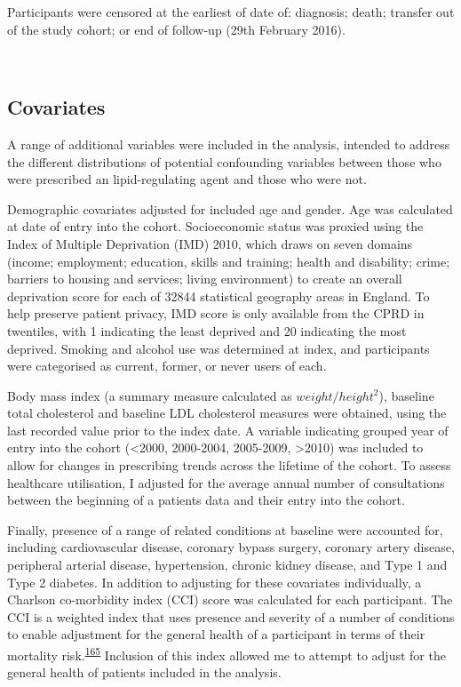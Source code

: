 \documentclass[a4paper, twoside]{templates/ociamthesis}
\begin{document}
Participants were censored at the earliest of date of: diagnosis; death; transfer out of the study cohort; or end of follow-up (29th February 2016).

~

\hypertarget{covariates}{%
\subsection{Covariates}\label{covariates}}

A range of additional variables were included in the analysis, intended to address the different distributions of potential confounding variables between those who were prescribed an lipid-regulating agent and those who were not.

Demographic covariates adjusted for included age and gender. Age was calculated at date of entry into the cohort. Socioeconomic status was proxied using the Index of Multiple Deprivation (IMD) 2010, which draws on seven domains (income; employment; education, skills and training; health and disability; crime; barriers to housing and services; living environment) to create an overall deprivation score for each of 32844 statistical geography areas in England. To help preserve patient privacy, IMD score is only available from the CPRD in twentiles, with 1 indicating the least deprived and 20 indicating the most deprived. Smoking and alcohol use was determined at index, and participants were categorised as current, former, or never users of each.

Body mass index (a summary measure calculated as \(weight/height^2\)), baseline total cholesterol and baseline LDL cholesterol measures were obtained, using the last recorded value prior to the index date. A variable indicating grouped year of entry into the cohort (\textless2000, 2000-2004, 2005-2009, \textgreater2010) was included to allow for changes in prescribing trends across the lifetime of the cohort. To assess healthcare utilisation, I adjusted for the average annual number of consultations between the beginning of a patients data and their entry into the cohort.

Finally, presence of a range of related conditions at baseline were accounted for, including cardiovascular disease, coronary bypass surgery, coronary artery disease, peripheral arterial disease, hypertension, chronic kidney disease, and Type 1 and Type 2 diabetes. In addition to adjusting for these covariates individually, a Charlson co-morbidity index (CCI) score was calculated for each participant. The CCI is a weighted index that uses presence and severity of a number of conditions to enable adjustment for the general health of a participant in terms of their mortality risk.\textsuperscript{\protect\hyperlink{ref-charlson1987new}{165}} Inclusion of this index allowed me to attempt to adjust for the general health of patients included in the analysis.
\end{document}
